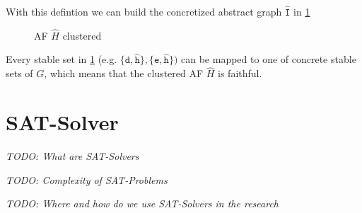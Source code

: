 With this defintion we can build the concretized abstract graph $\mathtt{\hat{I}}$ in \ref{af:backgroundClusterExample3}


\begin{figure}[h]
    \centering
    \caption{\ac{AF} $\hat{H}$ clustered}
    \label{af:backgroundClusterExample3}
\end{figure}

Every stable set in \ref{af:backgroundClusterExample3} (e.g. $\mathtt{\{d, \hat{h}\}, \{e, \hat{h}\}})$ can be mapped to one of concrete stable sets of $G$, which means that the clustered AF $\hat{H}$ is faithful.






\section{SAT-Solver}

\textit{TODO: What are SAT-Solvers}

\textit{TODO: Complexity of SAT-Problems}

\textit{TODO: Where and how do we use SAT-Solvers in the research}

